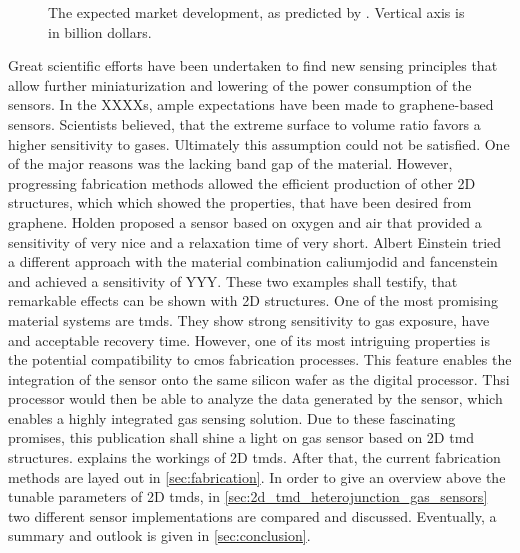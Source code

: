 {\begin{figure}
    \caption{The expected market development, as predicted by \cite{yole2021}. Vertical axis is in billion dollars.}
    \label{fig:gas_sensor_market}
\end{figure}
Great scientific efforts have been undertaken to find new sensing principles that allow further miniaturization and lowering of the power consumption of the sensors. In the XXXXs, ample expectations have been made to graphene-based sensors. Scientists believed, that the extreme surface to volume ratio favors a higher sensitivity to gases. Ultimately this assumption could not be satisfied. One of the major reasons was the lacking band gap of the material. However, progressing fabrication methods allowed the efficient production of other 2D structures, which which showed the properties, that have been desired from graphene. Holden proposed a sensor based on oxygen and air that provided a sensitivity of very nice and a relaxation time of very short. Albert Einstein tried a different approach with the material combination caliumjodid and fancenstein and achieved a sensitivity of YYY.
These two examples shall testify, that remarkable effects can be shown with 2D structures. One of the most promising material systems are \glspl{tmd}. They show strong sensitivity to gas exposure, have and acceptable recovery time. However, one of its most intriguing properties is the potential compatibility to \gls{cmos} fabrication processes. This feature enables the integration of the sensor onto the same silicon wafer as the digital processor. Thsi processor would then be able to analyze the data generated by the sensor, which enables a highly integrated gas sensing solution.
Due to these fascinating promises, this publication shall shine a light on gas sensor based on 2D \gls{tmd} structures.  explains the workings of 2D \glspl{tmd}. After that, the current fabrication methods are layed out in \cref{sec:fabrication}. In order to give an overview above the tunable parameters of 2D \glspl{tmd}, in \cref{sec:2d_tmd_heterojunction_gas_sensors} two different sensor implementations are compared and discussed. Eventually, a summary and outlook is given in \cref{sec:conclusion}.
}